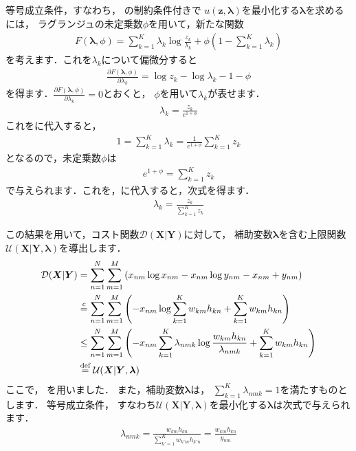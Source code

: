 等号成立条件，すなわち，
の制約条件付きで
$u(\bm{z},\bm\lambda)$を最小化する$\bm\lambda$を求めるには，
ラグランジュの未定乗数$\phi$を用いて，新たな関数
\begin{align}
F(\bm\lambda,\phi) = \sum_{k=1}^K \lambda_k \log \frac{z_k}{\lambda_k} + \phi \left(1 - \sum_{k=1}^K \lambda_k\right)
\end{align}
を考えます．これを$\lambda_k$について偏微分すると
\begin{align}
\frac{\partial F(\bm\lambda,\phi)}{\partial\lambda_k} 
= \log z_k - \log \lambda_k - 1 - \phi
\end{align}
を得ます．$\frac{\partial F(\bm\lambda,\phi)}{\partial\lambda_k} = 0$とおくと，
$\phi$を用いて$\lambda_k$が表せます．
\begin{align}
\lambda_k = \frac{z_k}{e^{1+\phi}}
\label{eqn:lambda_k_kl_nmf}
\end{align}
これをに代入すると，
\begin{align}
1 = \sum_{k=1}^K \lambda_k = \frac{1}{e^{1+\phi}}\sum_{k=1}^K z_k
\end{align}
となるので，未定乗数$\phi$は
\begin{align}
e^{1+\phi} = \sum_{k=1}^K z_k
\end{align}
で与えられます．これを，に代入すると，次式を得ます．
\begin{align}
\lambda_k = \frac{z_k}{\sum_{k=1}^K z_k}
\end{align}

この結果を用いて，コスト関数$\mathcal{D}(\bm{X}|\bm{Y})$に対して，
補助変数$\bm\lambda$を含む上限関数$\mathcal{U}(\bm{X}|\bm{Y},\bm\lambda)$を導出します．
\begin{align}
\mathcal{D}(\bm{X}|\bm{Y}) 
&= \sum_{n=1}^N \sum_{m=1}^M \left(x_{nm} \log x_{nm} - x_{nm} \log y_{nm} - x_{nm} + y_{nm}\right)
\nonumber\\
&\overset{c}{=} \sum_{n=1}^N \sum_{m=1}^M \left(- x_{nm} \log \sum_{k=1}^K w_{km}h_{kn} + \sum_{k=1}^K w_{km}h_{kn}\right)
\nonumber\\
&\le \sum_{n=1}^N \sum_{m=1}^M \left(- x_{nm} \sum_{k=1}^K \lambda_{nmk} \log \frac{w_{km}h_{kn}}{\lambda_{nmk}} + \sum_{k=1}^K w_{km}h_{kn}\right)
\nonumber\\
&\overset{\mbox{\scriptsize{def}}}{=} \mathcal{U}(\bm{X}|\bm{Y},\bm\lambda)
\label{eqn:kl_nmf_u}
\end{align}
ここで，
を用いました．
また，補助変数$\bm\lambda$は，
$\sum_{k=1}^K \lambda_{nmk} = 1$を満たすものとします．
等号成立条件，
すなわち$\mathcal{U}(\bm{X}|\bm{Y},\bm\lambda)$を最小化する$\bm\lambda$は次式で与えられます．
\begin{align}
\lambda_{nmk} 
= \frac{w_{km}h_{kn}}{\sum_{k'=1}^K w_{k'm}h_{k'n}}
= \frac{w_{km}h_{kn}}{y_{nm}}
\label{eqn:kl_nmf_mu_lambda}
\end{align}

